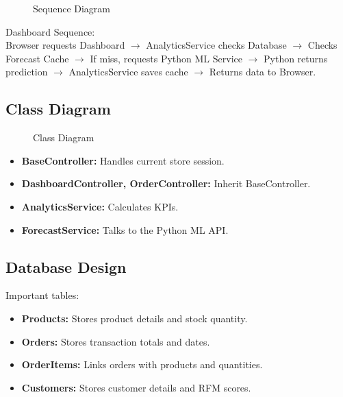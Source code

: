\documentclass[12pt,a4paper]{report}
\begin{document}
\begin{figure}[H]
    \centering
    
    \caption{Sequence Diagram}
\end{figure}

Dashboard Sequence:\\
Browser requests Dashboard $\rightarrow$ AnalyticsService checks Database $\rightarrow$ Checks Forecast Cache $\rightarrow$ If miss, requests Python ML Service $\rightarrow$ Python returns prediction $\rightarrow$ AnalyticsService saves cache $\rightarrow$ Returns data to Browser.

\subsection{Class Diagram}

\begin{figure}[H]
    \centering
    
    \caption{Class Diagram}
\end{figure}

\begin{itemize}
    \item \textbf{BaseController:} Handles current store session.
    \item \textbf{DashboardController, OrderController:} Inherit BaseController.
    \item \textbf{AnalyticsService:} Calculates KPIs.
    \item \textbf{ForecastService:} Talks to the Python ML API.
\end{itemize}

\subsection{Database Design}
Important tables:
\begin{itemize}
    \item \textbf{Products:} Stores product details and stock quantity.
    \item \textbf{Orders:} Stores transaction totals and dates.
    \item \textbf{OrderItems:} Links orders with products and quantities.
    \item \textbf{Customers:} Stores customer details and RFM scores.
\end{itemize}
\end{document}
